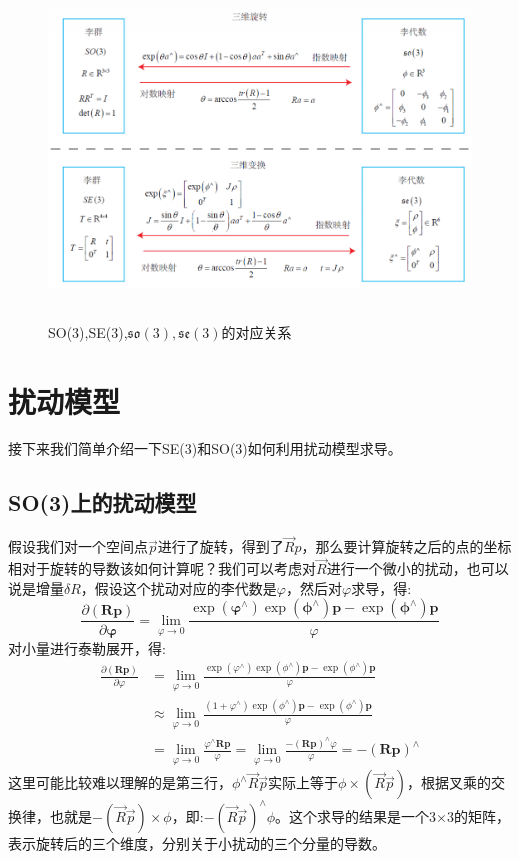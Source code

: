 \begin{figure}
	\centering
\includegraphics[height=9cm]{figures/lie.png}
\caption{SO(3),SE(3),$\mathfrak{so(3),se(3)}$的对应关系}
\end{figure}
\section{扰动模型}
接下来我们简单介绍一下SE(3)和SO(3)如何利用扰动模型求导。
\subsection{SO(3)上的扰动模型}
假设我们对一个空间点$\vec p$进行了旋转，得到了$\vec Rp$，那么要计算旋转之后的点的坐标相对于旋转的导数该如何计算呢？我们可以考虑对$\vec R$进行一个微小的扰动，也可以说是增量$\delta R$，假设这个扰动对应的李代数是$\varphi$，然后对$\varphi$求导，得:
\begin{equation}
\frac{\partial(\boldsymbol{R} \boldsymbol{p})}{\partial \boldsymbol{\varphi}}=\lim _{\varphi \rightarrow 0} \frac{\exp \left(\boldsymbol{\varphi}^{\wedge}\right) \exp \left(\boldsymbol{\phi}^{\wedge}\right) \boldsymbol{p}-\exp \left(\boldsymbol{\phi}^{\wedge}\right) \boldsymbol{p}}{\varphi}
\end{equation}
对小量进行泰勒展开，得:
\begin{equation}
\begin{aligned}
\frac{\partial(\boldsymbol{R p})}{\partial \varphi} &=\lim _{\varphi \rightarrow 0} \frac{\exp \left(\varphi^{\wedge}\right) \exp \left(\phi^{\wedge}\right) \boldsymbol{p}-\exp \left(\phi^{\wedge}\right) \boldsymbol{p}}{\varphi} \\ & \approx \lim _{\varphi \rightarrow 0} \frac{\left(1+\varphi^{\wedge}\right) \exp \left(\phi^{\wedge}\right) \boldsymbol{p}-\exp \left(\phi^{\wedge}\right) \boldsymbol{p}}{\varphi} \\ &=\lim _{\varphi \rightarrow 0} \frac{\varphi^{\wedge} \boldsymbol{R p}}{\varphi}=\lim _{\varphi \rightarrow 0} \frac{-(\boldsymbol{R p})^{\wedge} \varphi}{\varphi}=-(\boldsymbol{R p})^{\wedge}
\end{aligned}
\end{equation}
这里可能比较难以理解的是第三行，$\phi^\wedge\vec R \vec p$实际上等于$\phi\times (\vec R \vec p)$，根据叉乘的交换律，也就是$-(\vec R \vec p)\times \phi$，即:$-(\vec R \vec p)^\wedge \phi$。这个求导的结果是一个3$\times$3的矩阵，表示旋转后的三个维度，分别关于小扰动的三个分量的导数。
